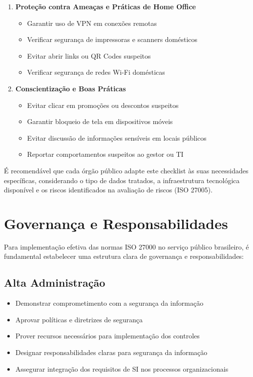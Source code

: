 \documentclass[12pt,a4paper]{report}
\begin{document}
\begin{enumerate}
  \item \textbf{Proteção contra Ameaças e Práticas de Home Office}
  \begin{itemize}
    \item Garantir uso de VPN em conexões remotas
    \item Verificar segurança de impressoras e scanners domésticos
    \item Evitar abrir links ou QR Codes suspeitos
    \item Verificar segurança de redes Wi-Fi domésticas
  \end{itemize}

  \item \textbf{Conscientização e Boas Práticas}
  \begin{itemize}
    \item Evitar clicar em promoções ou descontos suspeitos
    \item Garantir bloqueio de tela em dispositivos móveis
    \item Evitar discussão de informações sensíveis em locais públicos
    \item Reportar comportamentos suspeitos ao gestor ou TI
  \end{itemize}
\end{enumerate}

\begin{notebox}
É recomendável que cada órgão público adapte este checklist às suas necessidades específicas, considerando o tipo de dados tratados, a infraestrutura tecnológica disponível e os riscos identificados na avaliação de riscos (ISO 27005).
\end{notebox}

\section{Governança e Responsabilidades}

Para implementação efetiva das normas ISO 27000 no serviço público brasileiro, é fundamental estabelecer uma estrutura clara de governança e responsabilidades:

\subsection{Alta Administração}

\begin{itemize}
  \item Demonstrar comprometimento com a segurança da informação
  \item Aprovar políticas e diretrizes de segurança
  \item Prover recursos necessários para implementação dos controles
  \item Designar responsabilidades claras para segurança da informação
  \item Assegurar integração dos requisitos de SI nos processos organizacionais
\end{itemize}
\end{document}
